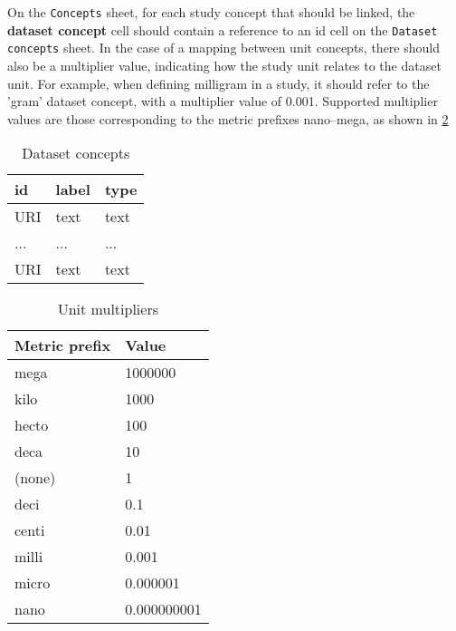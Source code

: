 \documentclass[a4paper,10pt]{article}
\begin{document}
On the \texttt{Concepts} sheet, for each study concept that should be linked, the \textbf{dataset concept} cell should contain a reference to an id cell on the \texttt{Dataset concepts} sheet. In the case of a mapping between unit concepts, there should also be a multiplier value, indicating how the study unit relates to the dataset unit. For example, when defining milligram in a study, it should refer to the 'gram' dataset concept, with a multiplier value of 0.001. Supported multiplier values are those corresponding to the metric prefixes nano--mega, as shown in \ref{table:Unit multipliers}

\begin{table}[!h]
  \centering
  \caption{Dataset concepts}
  \label{table:Dataset concepts}
  \begin{tabular}{|l|l|l|}
    \hline
    \textbf{id} & \textbf{label} & \textbf{type} \\ \hline
    URI         & text           & text          \\ \hline
    ...         & ...            & ...           \\ \hline
    URI         & text           & text          \\ \hline
  \end{tabular}
\end{table}

\begin{table}[!h]
  \centering
  \caption{Unit multipliers}
  \label{table:Unit multipliers}
  \begin{tabular}{|l|l|}
    \hline
    Metric prefix & Value \\ \hline
    mega   & 1000000\\ \hline
    kilo   &	1000 	\\ \hline
    hecto  & 100 	\\ \hline
    deca   & 10 	\\ \hline
    (none) & 1 	\\ \hline
    deci   & 0.1 	\\ \hline
    centi  & 0.01 	\\ \hline
    milli  & 0.001 	\\ \hline
    micro  & 0.000001 \\ \hline
    nano   & 0.000000001 	\\ \hline
  \end{tabular}
\end{table}
\end{document}
